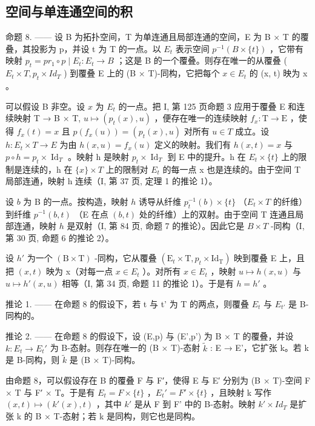 \subsection{空间与单连通空间的积}

命题 8. —— 设 B 为拓扑空间，T 为单连通且局部连通的空间，E 为 B × T 的覆叠，其投影为 p，并设 t 为 T 的一点。以 \(E_{t}\) 表示空间 \(p^{-1}(B \times \{t\})\) ，它带有映射 \(p_{t} = pr_{1} \circ p \mid E_{t}: E_{t} \to B\) ；这是 B 的一个覆叠。则存在唯一的从覆叠 ( \(E_{t} \times T, p_{t} \times Id_{T}\) ) 到覆叠 E 上的 (B × T)-同构，它把每个 \(x \in E_{t}\) 的 (x, t) 映为 x 。

可以假设 B 非空。设 \(x\) 为 \(E_t\) 的一点。把 I, 第 125 页命题 3 应用于覆叠 E 和连续映射 T → B × T, \(u \mapsto (p_t(x), u)\) ，便存在唯一的连续映射 \(f_x \colon \mathrm{T} \to \mathrm{E}\) ，使得 \(f_x(t) = x\) 且 \(p(f_x(u)) = (p_t(x), u)\) 对所有 \(u \in T\) 成立。设 \(h \colon E_t \times T \to E\) 为由 \(h(x, u) = f_x(u)\) 定义的映射。我们有 \(h(x, t) = x\) 与 \(p \circ h = p_t \times \operatorname{Id}_T\) 。映射 h 是映射 \(p_t \times \operatorname{Id}_T\) 到 E 中的提升。h 在 \(E_t \times \{t\}\) 上的限制是连续的，h 在 \(\{x\} \times T\) 上的限制对 \(E_t\) 的每一点 x 也是连续的。由于空间 T 局部连通，映射 h 连续（I, 第 37 页, 定理 1 的推论 1）。

设 \(b\) 为 B 的一点。按构造，映射 \(h\) 诱导从纤维 \(p_t^{-1}(b) \times \{t\}\) （\(E_t \times T\) 的纤维）到纤维 \(p^{-1}(b,t)\) （E 在点 \((b,t)\) 处的纤维）上的双射。由于空间 T 连通且局部连通，映射 \(h\) 是双射（I, 第 84 页, 命题 7 的推论）。因此它是 \(B \times T\) -同构（I, 第 30 页, 命题 6 的推论 2）。

设 \(h'\) 为一个 \((\mathrm{B} \times \mathrm{T})\) -同构，它从覆叠 \((\mathrm{E}_{t} \times \mathrm{T}, p_{t} \times \mathrm{Id}_{\mathrm{T}})\) 映到覆叠 E 上，且把 \((x, t)\) 映为 x（对每一点 \(x \in E_{t}\) ）。对所有 \(x \in E_{t}\) ，映射 \(u \mapsto h(x, u)\) 与 \(u \mapsto h'(x, u)\) 相等（I, 第 34 页, 命题 11 的推论 1）。于是有 \(h = h'\) 。

推论 1. —— 在命题 8 的假设下，若 t 与 t' 为 T 的两点，则覆叠 \(E_{t}\) 与 \(E_{t'}\) 是 B-同构的。

推论 2. —— 在命题 8 的假设下，设 (E,p) 与 (E',p') 为 B × T 的覆叠，并设 \(k: E_t \to E_t'\) 为 B-态射。则存在唯一的 (B × T)-态射 \(\widetilde{k}\) : E → E'，它扩张 k。若 k 是 B-同构，则 \(\widetilde{k}\) 是 (B × T)-同构。

由命题 8，可以假设存在 B 的覆叠 F 与 F′，使得 E 与 E′ 分别为 (B × T)-空间 F × T 与 F′ × T。于是有 \(E_{t} = F \times \{t\}\) ，\(E_{t}' = F' \times \{t\}\) ，且映射 k 写作 \((x, t) \mapsto (k'(x), t)\) ，其中 \(k'\) 是从 F 到 F' 中的 B-态射。映射 \(k' \times Id_{T}\) 是扩张 k 的 B × T-态射；若 k 是同构，则它也是同构。

